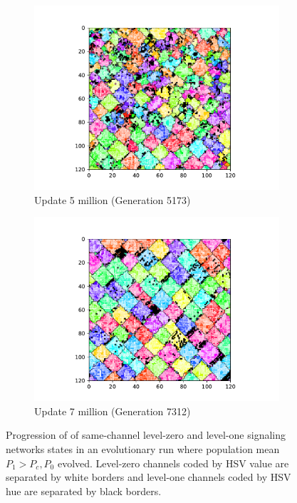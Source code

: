 \begin{figure}[!htbp]
\begin{center}
\begin{subfigure}[b]{0.5\columnwidth}
  \includegraphics[width=\columnwidth,trim={2.5cm 0.5cm 2.5cm 1cm},clip]{img/ChannelMap_1011_update5000000}
  \caption{Update 5 million (Generation 5173)}
  \label{fig:ChannelMap_1011_update5000000}
\end{subfigure}%
\begin{subfigure}[b]{0.5\columnwidth}
  \includegraphics[width=\columnwidth,trim={2.5cm 0.5cm 2.5cm 1cm},clip]{img/ChannelMap_1011_update7000000}
  \caption{Update 7 million (Generation 7312)}
  \label{fig:ChannelMap_1011_update7000000}
\end{subfigure}
\caption{
Progression of of same-channel level-zero and level-one signaling networks states in an evolutionary run where population mean $P_1 > P_{c}, P_0$ evolved.
Level-zero channels coded by HSV value are separated by white borders and level-one channels coded by HSV hue are separated by black borders.
}
\label{fig:grid_progression}
\end{center}
\end{figure}
